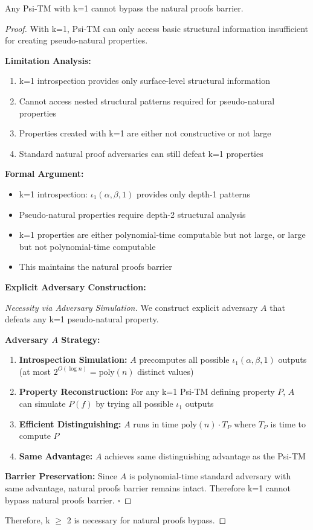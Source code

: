 \documentclass[11pt]{article}
\newcommand{\qed}{\hfill$\square$}
\begin{document}
\begin{theorem}
\label{thm:natural-proofs-k1}
Any Psi-TM with k=1 cannot bypass the natural proofs barrier.
\end{theorem}

\begin{proof}
With k=1, Psi-TM can only access basic structural information insufficient for creating pseudo-natural properties.

\textbf{Limitation Analysis:}
\begin{enumerate}
\item k=1 introspection provides only surface-level structural information
\item Cannot access nested structural patterns required for pseudo-natural properties
\item Properties created with k=1 are either not constructive or not large
\item Standard natural proof adversaries can still defeat k=1 properties
\end{enumerate}

\textbf{Formal Argument:}
\begin{itemize}
\item k=1 introspection: $\iota_1(\alpha, \beta, 1)$ provides only depth-1 patterns
\item Pseudo-natural properties require depth-2 structural analysis
\item k=1 properties are either polynomial-time computable but not large, or large but not polynomial-time computable
\item This maintains the natural proofs barrier
\end{itemize}

\textbf{Explicit Adversary Construction:}
\begin{proof}[Necessity via Adversary Simulation]
We construct explicit adversary $A$ that defeats any k=1 pseudo-natural property.

\textbf{Adversary $A$ Strategy:}
\begin{enumerate}
\item \textbf{Introspection Simulation:} $A$ precomputes all possible $\iota_1(\alpha, \beta, 1)$ outputs (at most $2^{O(\log n)} = \text{poly}(n)$ distinct values)
\item \textbf{Property Reconstruction:} For any k=1 Psi-TM defining property $P$, $A$ can simulate $P(f)$ by trying all possible $\iota_1$ outputs
\item \textbf{Efficient Distinguishing:} $A$ runs in time $\text{poly}(n) \cdot T_{P}$ where $T_P$ is time to compute $P$
\item \textbf{Same Advantage:} $A$ achieves same distinguishing advantage as the Psi-TM
\end{enumerate}

\textbf{Barrier Preservation:} Since $A$ is polynomial-time standard adversary with same advantage, natural proofs barrier remains intact. Therefore k=1 cannot bypass natural proofs barrier. \qed
\end{proof}

Therefore, k $\geq$ 2 is necessary for natural proofs bypass.
\end{proof}
\end{document}
